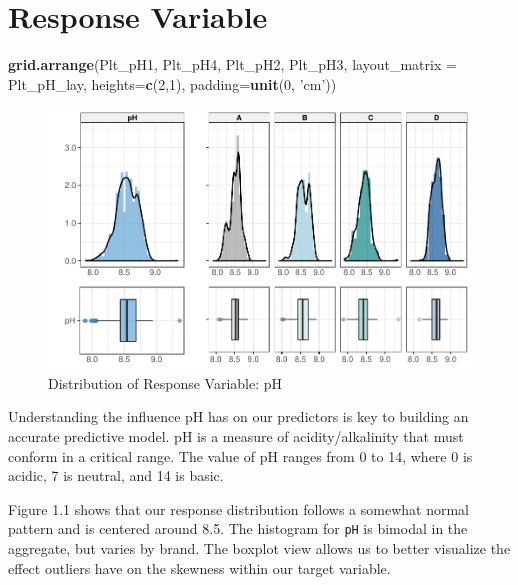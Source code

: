 \documentclass[]{report}
\newenvironment{Shaded}{\begin{snugshade}}{\end{snugshade}}
\newcommand{\DataTypeTok}[1]{\textcolor[rgb]{0.13,0.29,0.53}{#1}}
\newcommand{\DecValTok}[1]{\textcolor[rgb]{0.00,0.00,0.81}{#1}}
\newcommand{\KeywordTok}[1]{\textcolor[rgb]{0.13,0.29,0.53}{\textbf{#1}}}
\newcommand{\NormalTok}[1]{#1}
\newcommand{\StringTok}[1]{\textcolor[rgb]{0.31,0.60,0.02}{#1}}
\begin{document}
\hypertarget{response-variable}{%
\section{Response Variable}\label{response-variable}}

\begin{Shaded}
\begin{Highlighting}[]
\KeywordTok{grid.arrange}\NormalTok{(Plt_pH1, Plt_pH4, Plt_pH2, Plt_pH3, }\DataTypeTok{layout_matrix =}\NormalTok{ Plt_pH_lay, }\DataTypeTok{heights=}\KeywordTok{c}\NormalTok{(}\DecValTok{2}\NormalTok{,}\DecValTok{1}\NormalTok{), }\DataTypeTok{padding=}\KeywordTok{unit}\NormalTok{(}\DecValTok{0}\NormalTok{, }\StringTok{'cm'}\NormalTok{))}
\end{Highlighting}
\end{Shaded}

\begin{figure}

\hfill{}\includegraphics[width=1\textwidth]{Proj2-JM_files/figure-latex/unnamed-chunk-2-1} 

\caption{Distribution of Response Variable: pH}\label{fig:unnamed-chunk-2}
\end{figure}

Understanding the influence pH has on our predictors is key to building
an accurate predictive model. pH is a measure of acidity/alkalinity that
must conform in a critical range. The value of pH ranges from 0 to 14,
where 0 is acidic, 7 is neutral, and 14 is basic.

Figure 1.1 shows that our response distribution follows a somewhat
normal pattern and is centered around 8.5. The histogram for \texttt{pH}
is bimodal in the aggregate, but varies by brand. The boxplot view
allows us to better visualize the effect outliers have on the skewness
within our target variable.
\end{document}
